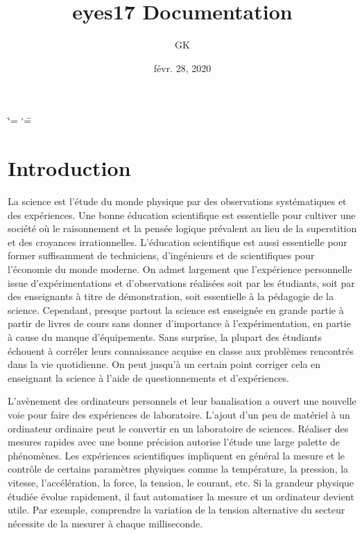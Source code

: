 \documentclass[a4paper,12pt,french]{sphinxmanual}
\title{eyes17 Documentation}
\date{févr. 28, 2020}
\author{GK}
\begin{document}
\ifdefined\shorthandoff
  \ifnum\catcode`\=\string=\active\shorthandoff{=}\fi
  \ifnum\catcode`\"=\active{}\fi
\fi

\pagestyle{empty}


\pagestyle{plain}
\sphinxtableofcontents
\pagestyle{normal}
\label{\detokenize{index::doc}}



\chapter{Introduction}
\label{\detokenize{1.1:introduction}}\label{\detokenize{1.1::doc}}
La science est l’étude du monde physique par des observations systématiques
et des expériences. Une bonne éducation scientifique est essentielle
pour cultiver une société où le raisonnement et la pensée logique
prévalent au lieu de la superstition et des croyances irrationnelles.
L’éducation scientifique est aussi essentielle pour former suffisamment
de techniciens, d’ingénieurs et de scientifiques pour l’économie du
monde moderne. On admet largement que l’expérience personnelle issue
d’expérimentations et d’observations réalisées soit par les étudiants,
soit par des enseignants à titre de démonstration, soit essentielle
à la pédagogie de la science. Cependant, presque partout la science
est enseignée en grande partie à partir de livres de cours sans donner
d’importance à l’expérimentation, en partie à cause du manque d’équipements.
Sans surprise, la plupart des étudiants échouent à corréler leurs
connaissance acquise en classe aux problèmes rencontrés dans la vie
quotidienne. On peut jusqu’à un certain point corriger cela en enseignant
la science à l’aide de questionnements et d’expériences.

L’avènement des ordinateurs personnels et leur banalisation a ouvert
une nouvelle voie pour faire des expériences de laboratoire. L’ajout
d’un peu de matériel à un ordinateur ordinaire peut le convertir en
un laboratoire de sciences. Réaliser des mesures rapides avec une
bonne précision autorise l’étude une large palette de phénomènes.
Les expériences scientifiques impliquent en général la mesure et le
contrôle de certains paramètres physiques comme la température, la
pression, la vitesse, l’accélération, la force, la tension, le courant,
etc. Si la grandeur physique étudiée évolue rapidement, il faut automatiser
la mesure et un ordinateur devient utile. Par exemple, comprendre
la variation de la tension alternative du secteur nécessite de la
mesurer à chaque milliseconde.
\end{document}
